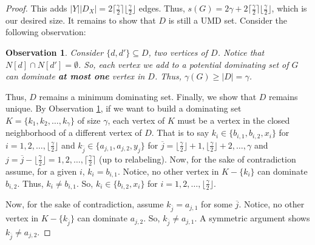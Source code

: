 \documentclass[12pt]{amsart}
\newcommand{\floor}[1]{\lfloor{#1}\rfloor}
\newcommand{\ceil}[1]{\lceil{#1}\rceil}
\newtheorem{obs}[thm]{Observation}
\begin{document}
\begin{proof}
This adds $|Y||D_X| = 2\ceil{\frac{\gamma}{2}}\floor{\frac{\gamma}{2}}$ edges. Thus, $s(G) = 2 \gamma + 2 \lceil \frac{\gamma}{2} \rceil \lfloor \frac{\gamma}{2} \rfloor$, which is our desired size. It remains to show that $D$ is still a UMD set. Consider the following observation:
\begin{obs}\label{obs:NoCommonNeighbs}
    Consider $\{d,d'\} \subseteq D$, two vertices of $D$. Notice that $N[d] \cap N[d'] = \emptyset$. So, each vertex we add to a potential dominating set of $G$ can dominate \textbf{at most one} vertex in $D$. Thus, $\gamma(G) \geq |D| = \gamma$.
\end{obs}
Thus, $D$ remains a minimum dominating set. Finally, we show that $D$ remains unique. By Observation \ref{obs:NoCommonNeighbs}, if we want to build a dominating set $K = \{k_1,k_2,\ldots,k_\gamma\}$ of size $\gamma$, each vertex of $K$ must be a vertex in the closed neighborhood of a different vertex of $D$. That is to say $k_i \in \{b_{i,1},b_{i,2},x_i\}$ for $i = 1,2,\ldots,\floor{\frac{\gamma}{2}}$ and $k_{\overline{j}} \in \{a_{j,1},a_{j,2},y_j\}$ for $\overline{j} = \floor{\frac{\gamma}{2}} + 1 ,\floor{\frac{\gamma}{2}} + 2, \ldots, \gamma$ and $j = \overline{j} - \floor{\frac{\gamma}{2}} = 1,2,\ldots,\ceil{\frac{\gamma}{2}}$ (up to relabeling). Now, for the sake of contradiction assume, for a given $i$, $k_i = b_{i,1}$. Notice, no other vertex in $K - \{k_i\}$ can dominate $b_{i,2}$. Thus, $k_i \not=b_{i,1}$. So, $k_i \in \{b_{i,2},x_i\}$ for $i = 1,2,\ldots,\floor{\frac{\gamma}{2}}$.

Now, for the sake of contradiction, assume $k_{\overline{j}} = a_{j,1}$ for some $\overline{j}$. Notice, no other vertex in $K - \{k_{\overline{j}}\}$ can dominate $a_{j,2}$. So, $k_{\overline{j}} \not=a_{j,1}$. A symmetric argument shows $k_{\overline{j}} \not=a_{j,2}$. 


\end{proof}
\end{document}
